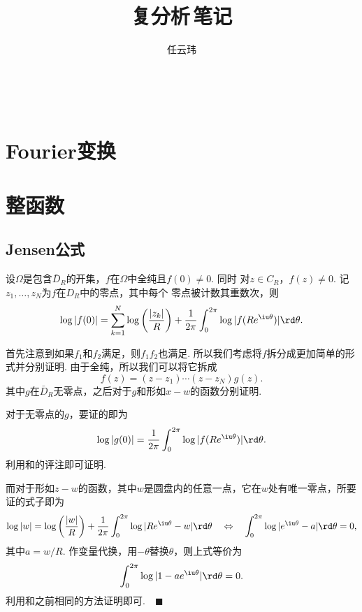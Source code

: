 

\title{复分析$\,$笔记}
\author{任云玮}
\date{}



\maketitle
\tableofcontents

\newpage

 
\newpage


\newpage


\newpage
\section{Fourier变换}

\newpage
\section{整函数}

\subsection{Jensen公式}

  \begin{thm}[Jensen]
    \label{thm: Jensen}
    设$\Omega$是包含$\bar{D}_R$的开集，$f$在$\Omega$中全纯且$f(0)\ne 0$. 同时
    对$z\in C_R$，$f(z)\ne 0$. 记$z_1,\dots,z_N$为$f$在$D_R$中的零点，其中每个
    零点被计数其重数次，则
    \begin{equation}
      \label{equ: Jensen}
      \log|f(0)| = \sum_{k=1}^N\log\left( \frac{|z_k|}{R} \right)
      + \frac{1}{2\pi}\int_0^{2\pi}\log|f(Re^{\iu\theta})|\rd\theta.
    \end{equation}
  \end{thm}
  \remark
  \proof
    首先注意到如果$f_1$和$f_2$满足，则$f_1f_2$也满足.
    所以我们考虑将$f$拆分成更加简单的形式并分别证明. 由于全纯，所以我们可以将它拆成
    \[
      f(z) = (z-z_1)\cdots (z-z_N)g(z).
    \]
    其中$g$在$\bar{D}_R$无零点，之后对于$g$和形如$x-w$的函数分别证明.\par
    对于无零点的$g$，要证的即为
    \[
      \log|g(0)| = \frac{1}{2\pi}\int_0^{2\pi}\log|f(Re^{\iu\theta})|\rd\theta.
    \]
    利用和的评注即可证明.\par
    而对于形如$z-w$的函数，其中$w$是圆盘内的任意一点，它在$w$处有唯一零点，所要证的式子即为
    \[
      \log|w|=\log\left( \frac{|w|}{R} \right) + \frac{1}{2\pi}\int_0^{2\pi}
      \log|Re^{\iu\theta} - w|\rd\theta \quad\Leftrightarrow\quad
      \int_0^{2\pi}\log|e^{\iu\theta}-a|\rd\theta = 0,
    \]
    其中$a=w/R$. 作变量代换，用$-\theta$替换$\theta$，则上式等价为
    \[
      \int_0^{2\pi}\log|1-ae^{\iu\theta}|\rd\theta = 0.
    \]
    利用和之前相同的方法证明即可.$\quad\blacksquare$

